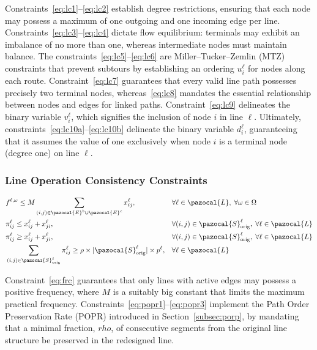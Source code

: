 \documentclass[3p,times,procedia]{elsarticle}
\begin{document}
Constraints~\eqref{eq:lc1}--\eqref{eq:lc2} establish degree restrictions, ensuring that each node may possess a maximum of one outgoing and one incoming edge per line.  
Constraints~\eqref{eq:lc3}--\eqref{eq:lc4} dictate flow equilibrium: terminals may exhibit an imbalance of no more than one, whereas intermediate nodes must maintain balance.  
The constraints~\eqref{eq:lc5}--\eqref{eq:lc6} are Miller--Tucker--Zemlin (MTZ) constraints that prevent subtours by establishing an ordering $u_i^{\ell}$ for nodes along each route.  
Constraint~\eqref{eq:lc7} guarantees that every valid line path possesses precisely two terminal nodes, whereas~\eqref{eq:lc8} mandates the essential relationship between nodes and edges for linked paths.  
Constraint~\eqref{eq:lc9} delineates the binary variable $v_i^{\ell}$, which signifies the inclusion of node $i$ in line $\ell$.  
Ultimately, constraints~\eqref{eq:lc10a}--\eqref{eq:lc10b} delineate the binary variable $d_i^{\ell}$, guaranteeing that it assumes the value of one exclusively when node $i$ is a terminal node (degree one) on line $\ell$.

\subsubsection{Line Operation Consistency Constraints}

\begin{align}
& f^{\ell,\omega} \leq M \sum_{(i,j) \in \pazocal{E}^b \cup \pazocal{E}^c} x_{ij}^\ell, 
&& \forall \ell \in \pazocal{L},\; \forall \omega \in \Omega 
\label{eq:frc} \\
& \pi_{ij}^\ell \leq x_{ij}^\ell + x_{ji}^\ell, 
&& \forall (i,j) \in \pazocal{S}_\text{orig}^\ell,\; \forall \ell \in \pazocal{L} 
\label{eq:popr1} \\
& \pi_{ij}^\ell \geq x_{ij}^\ell + x_{ji}^\ell, 
&& \forall (i,j) \in \pazocal{S}_\text{orig}^\ell,\; \forall \ell \in \pazocal{L} 
\label{eq:popr2} \\
& \sum_{(i,j) \in \pazocal{S}_\text{orig}^\ell} \pi_{ij}^\ell 
\geq \rho \times |\pazocal{S}_\text{orig}^\ell| \times p^\ell, 
&& \forall \ell \in \pazocal{L} 
\label{eq:popr3}
\end{align}

Constraint~\eqref{eq:frc} guarantees that only lines with active edges may possess a positive frequency, where $M$ is a suitably big constant that limits the maximum practical frequency.
Constraints~\eqref{eq:popr1}--\eqref{eq:popr3} implement the Path Order Preservation Rate (POPR) introduced in Section~\ref{subsec:porp}, by mandating that a minimal fraction, $rho$, of consecutive segments from the original line structure be preserved in the redesigned line.
\end{document}
